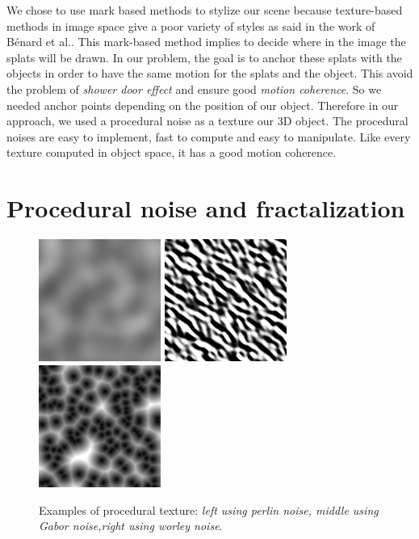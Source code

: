 We chose to use mark based methods to stylize our scene because texture-based methods in image space give a poor variety of styles as said in the work of Bénard et al.\cite{benard_dynamic_2009}. This mark-based method implies to decide where in the image the splats will be drawn. In our problem, the goal is to anchor these splats with the objects in order to have the same motion for the splats and the object. This avoid the problem of \textit{shower door effect} and ensure good \textit{motion coherence}. So we needed anchor points depending on the position of our object. Therefore in our approach, we used a procedural noise\cite{perlin_improving_2002} as a texture our 3D object. The procedural noises are easy to implement, fast to compute and easy to manipulate. Like every texture computed in object space, it has a good motion coherence.


\section{Procedural noise and fractalization}

\begin{figure}[H]
    \begin{center}
    \includegraphics[width=40mm, height=40mm]{images/PerlinNoise2d.png}
    \includegraphics[width=40mm, height=40mm]{images/GaborNoise2d.png}
    \includegraphics[width=40mm, height=40mm]{images/WorleyNoise2d.jpg}
    \end{center}
    \caption{Examples of procedural texture: \textit{left using perlin noise, middle using Gabor noise,right using worley noise}.}
    \label{procedural_texture}
\end{figure}

